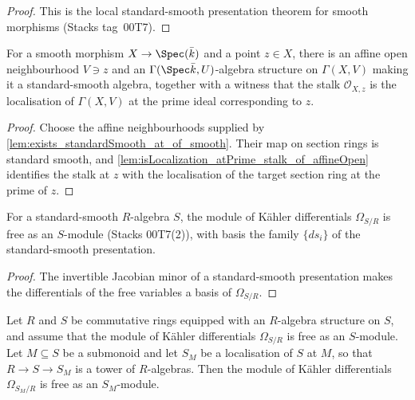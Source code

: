 \begin{proof}
  This is the local standard-smooth presentation theorem for smooth morphisms
  (Stacks tag~00T7).
\end{proof}

\begin{lemma}\leanok
  \label{lem:exists_algebra_standardSmooth_stalk_localization}
  For a smooth morphism \(X \to \Spec(\bar k)\) and a point \(z \in X\), there is
  an affine open neighbourhood \(V \ni z\) and an \(\Gamma(\Spec \bar k, U)\)-algebra
  structure on \(\Gamma(X, V)\) making it a standard-smooth algebra, together with a
  witness that the stalk \(\mathcal O_{X, z}\) is the localisation of \(\Gamma(X, V)\)
  at the prime ideal corresponding to \(z\).
\end{lemma}

\begin{proof}
  Choose the affine neighbourhoods supplied by
  \cref{lem:exists_standardSmooth_at_of_smooth}.  Their map on section rings is
  standard smooth, and
  \cref{lem:isLocalization_atPrime_stalk_of_affineOpen} identifies the stalk at
  \(z\) with the localisation of the target section ring at the prime of \(z\).
\end{proof}

\begin{lemma}\leanok
  \label{lem:module_free_kaehler_standardSmooth}
  For a standard-smooth \(R\)-algebra \(S\), the module of K\"ahler differentials
  \(\Omega_{S/R}\) is free as an \(S\)-module (Stacks 00T7(2)), with basis the family
  \(\{ds_i\}\) of the standard-smooth presentation.
\end{lemma}

\begin{proof}
  The invertible Jacobian minor of a standard-smooth presentation makes the
  differentials of the free variables a basis of \(\Omega_{S/R}\).
\end{proof}

\begin{lemma}\leanok
  \label{lem:module_free_kaehler_localization}
  Let \(R\) and \(S\) be commutative rings equipped with an \(R\)-algebra
  structure on \(S\), and assume that the module of K\"ahler differentials
  \(\Omega_{S/R}\) is free as an \(S\)-module. Let \(M \subseteq S\) be a
  submonoid and let \(S_M\) be a localisation of \(S\) at \(M\), so that
  \(R \to S \to S_M\) is a tower of \(R\)-algebras. Then the module of
  K\"ahler differentials \(\Omega_{S_M / R}\) is free as an
  \(S_M\)-module.
\end{lemma}

